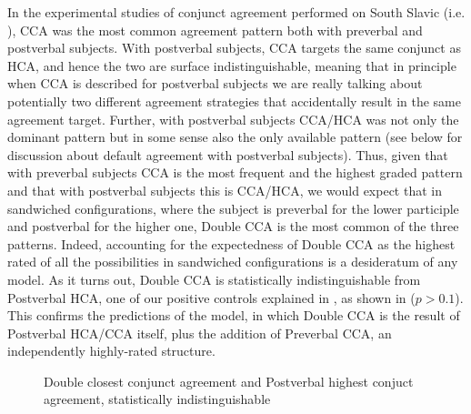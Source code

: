 \documentclass[output=paper
,modfonts
,nonflat]{langsci/langscibook}
\begin{document}
In the experimental studies of conjunct agreement performed on South Slavic (i.e. \citealt{marusicnevinsbadecker:15,willergold:16}), CCA was the most common agreement pattern both with preverbal and postverbal subjects. With postverbal subjects, CCA targets the same conjunct as HCA, and hence the two are surface indistinguishable, meaning that in principle when CCA is described for postverbal subjects we are really talking about potentially two different agreement strategies that accidentally result in the same agreement target. Further, with postverbal subjects CCA/HCA was not only the dominant pattern but in some sense also the only available pattern (see below for discussion about default agreement with postverbal subjects). Thus, given that with preverbal subjects CCA is the most frequent and the highest graded pattern and that with postverbal subjects this is CCA/HCA, we would expect that in sandwiched configurations, where the subject is preverbal for the lower participle and postverbal for the higher one, Double CCA is the most common of the three patterns. Indeed, accounting for the expectedness of Double CCA as the highest rated of all the possibilities in sandwiched configurations is a desideratum of any model. As it turns out, Double CCA is statistically indistinguishable from Postverbal HCA, one of our positive controls explained in , as shown in  ($p > 0.1$). This confirms the predictions of the model, in which Double CCA is the result of Postverbal HCA/CCA itself, plus the addition of Preverbal CCA, an independently highly-rated structure.


\begin{figure}  
\caption{Double closest conjunct agreement and Postverbal highest conjuct agreement, statistically indistinguishable\label{fig:figure_cca_postv}}
\end{figure}
\end{document}
